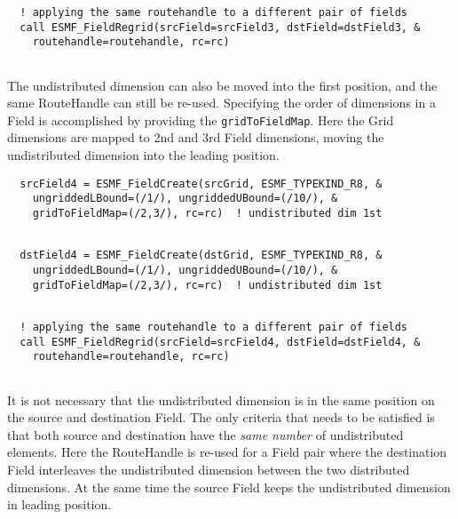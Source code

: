 
 \begin{verbatim}
  ! applying the same routehandle to a different pair of fields
  call ESMF_FieldRegrid(srcField=srcField3, dstField=dstField3, &
    routehandle=routehandle, rc=rc)
 
\end{verbatim}
 

   The undistributed dimension can also be moved into the first position,
   and the same RouteHandle can still be re-used. Specifying the order
   of dimensions in a Field is accomplished by providing the
   {\tt gridToFieldMap}. Here the Grid dimensions are mapped to 2nd and 3rd
   Field dimensions, moving the undistributed dimension into the leading
   position. 

 \begin{verbatim}
  srcField4 = ESMF_FieldCreate(srcGrid, ESMF_TYPEKIND_R8, &
    ungriddedLBound=(/1/), ungriddedUBound=(/10/), &
    gridToFieldMap=(/2,3/), rc=rc)  ! undistributed dim 1st 
 
\end{verbatim}
 

 \begin{verbatim}
  dstField4 = ESMF_FieldCreate(dstGrid, ESMF_TYPEKIND_R8, &
    ungriddedLBound=(/1/), ungriddedUBound=(/10/), &
    gridToFieldMap=(/2,3/), rc=rc)  ! undistributed dim 1st 
 
\end{verbatim}
 

 \begin{verbatim}
  ! applying the same routehandle to a different pair of fields
  call ESMF_FieldRegrid(srcField=srcField4, dstField=dstField4, &
    routehandle=routehandle, rc=rc)
 
\end{verbatim}
 

   It is not necessary that the undistributed dimension is in the same position
   on the source and destination Field. The only criteria that needs to be
   satisfied is that both source and destination have the {\em same number} of 
   undistributed elements. Here the RouteHandle is re-used for a 
   Field pair where the destination Field interleaves the undistributed dimension
   between the two distributed dimensions. At the same time the source Field
   keeps the undistributed dimension in leading position. 

